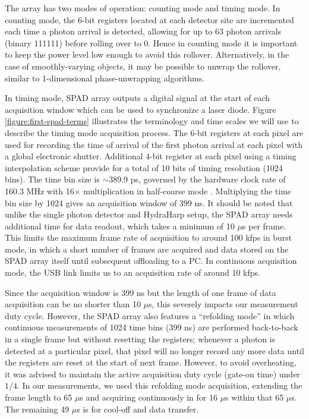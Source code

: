 The array has two modes of operation: counting mode and timing mode. In counting mode, the 6-bit registers located at each detector site are incremented each time a photon arrival is detected, allowing for up to 63 photon arrivals (binary 111111) before rolling over to 0. Hence in counting mode it is important to keep the power level low enough to avoid this rollover. Alternatively, in the case of smoothly-varying objects, it may be possible to unwrap the rollover, similar to 1-dimensional phase-unwrapping algorithms.

In timing mode, SPAD array outputs a digital signal at the start of each acquisition window which can be used to synchronize a laser diode. Figure \ref{figure:first-spad-terms} illustrates the terminology and time scales we will use to describe the timing mode acquisition process. The 6-bit registers at each pixel are used for recording the time of arrival of the first photon arrival at each pixel with a global electronic shutter. Additional 4-bit register at each pixel using a timing interpolation scheme \cite{villa-thesis} provide for a total of 10 bits of timing resolution (1024 bins). The time bin size is $\sim$389.9 ps, governed by the hardware clock rate of 160.3 MHz with 16$\times$ multiplication in half-coarse mode \cite{villa-thesis}. Multiplying the time bin size by 1024 gives an acquisition window of 399 ns. It should be noted that unlike the single photon detector and HydraHarp setup, the SPAD array needs additional time for data readout, which takes a minimum of 10 $\mu$s per frame. This limits the maximum frame rate of acquisition to around 100 kfps in burst mode, in which a short number of frames are acquired and data stored on the SPAD array itself until subsequent offloading to a PC. In continuous acquisition mode, the USB link limits us to an acquisition rate of around 10 kfps.

Since the acquisition window is 399 ns but the length of one frame of data acquisition can be no shorter than 10 $\mu$s, this severely impacts our measurement duty cycle. However, the SPAD array also features a ``refolding mode'' in which continuous measurements of 1024 time bins (399 ns) are performed back-to-back in a single frame but without resetting the registers; whenever a photon is detected at a particular pixel, that pixel will no longer record any more data until the registers are reset at the start of next frame. However, to avoid overheating, it was advised to maintain the active acquisition duty cycle (gate-on time) under $1/4$. In our measurements, we used this refolding mode acquisition, extending the frame length to 65 $\mu$s and acquiring continuously in for 16 $\mu$s within that 65 $\mu$s. The remaining 49 $\mu$s is for cool-off and data transfer.

